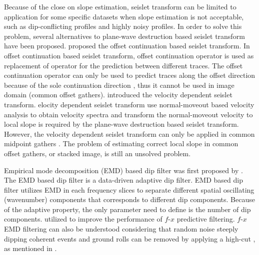 Because of the close  on slope estimation,  seislet transform can be limited  to  application for some specific datasets when slope estimation is not acceptable, such as dip-conflicting profiles and highly noisy profiles. In order to solve this problem, several alternatives to  plane-wave destruction based seislet transform have been proposed. \cite{liuyang2010} proposed the offset continuation based seislet transform. In  offset continuation based seislet transform,  offset continuation operator is used as  replacement of 
 operator for the prediction between different traces. The offset continuation operator can only be used to predict traces along the offset direction because of the sole continuation direction , thus it can\dlo{ }not be used in image domain (common offset gathers). \cite{liuyang2013} introduced the velocity dependent seislet transform.  elocity dependent seislet transform use normal-moveout based velocity analysis to obtain velocity spectra and transform the normal-moveout velocity to local slope  is required by the plane-wave destruction based seislet transform. However, the velocity dependent seislet transform can only be applied in common midpoint gathers . The problem of estimating correct local slope in common offset gathers, or stacked image, is still an unsolved problem. 

Empirical mode decomposition (EMD) based dip filter was first proposed by \cite{yangkang2014}. The EMD based dip filter is a data-driven adaptive dip filter. EMD based dip filter utilizes EMD in each frequency slices to separate different spatial oscillating (wavenumber) components that corresponds to different dip components. Because of the adaptive property, the only parameter  need to define is the number of dip components. \cite{yangkang2014} utilized  to improve the  performance of $f$-$x$ predictive filtering. $f$-$x$ EMD filtering can also be understood   considering that random noise\wen{,} steeply dipping coherent events and ground rolls can be removed by applying a high-cut , as mentioned in \cite[]{yangkang2014}. 


